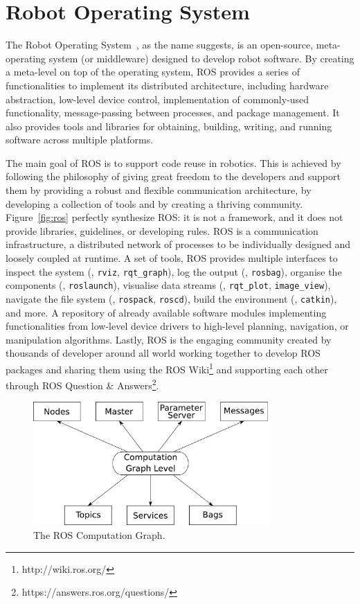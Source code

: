 \section{Robot Operating System}
\label{sec:ros}
The Robot Operating System~\cite{quigley2009ros}, as the name suggests, is an open-source, meta-operating system (or middleware) designed to develop robot software. By creating a meta-level on top of the operating system, ROS provides a series of functionalities to implement its distributed architecture, including hardware abstraction, low-level device control, implementation of commonly-used functionality, message-passing between processes, and package management. It also provides tools and libraries for obtaining, building, writing, and running software across multiple platforms.

The main goal of ROS is to support code reuse in robotics. This is achieved by following the philosophy of giving great freedom to the developers and support them by providing a robust and flexible communication architecture, by developing a collection of tools and by creating a thriving community. Figure~\ref{fig:ros} perfectly synthesize ROS: it is not a framework, and it does not provide libraries, guidelines, or developing rules. ROS is a communication infrastructure, a distributed network of processes to be individually designed and loosely coupled at runtime. A set of tools, ROS provides multiple interfaces to inspect the system (\eg, \texttt{rviz}, \texttt{rqt\_graph}), log the output (\eg, \texttt{rosbag}), organise the components (\eg, \texttt{roslaunch}), visualise data streams (\eg, \texttt{rqt\_plot}, \texttt{image\_view}), navigate the file system (\eg, \texttt{rospack}, \texttt{roscd}), build the environment (\eg, \texttt{catkin}), and more. A repository of already available software modules implementing functionalities from low-level device drivers to high-level planning, navigation, or manipulation algorithms. Lastly, ROS is the engaging community created by thousands of developer around all world working together to develop ROS packages and sharing them using the ROS Wiki\footnote{http://wiki.ros.org/} and supporting each other through ROS Question \& Answers\footnote{https://answers.ros.org/questions/}.

\begin{figure}[t]
    \centering
    \includegraphics[width=0.8\textwidth]{gfx/ros/graph}
    \caption{The ROS Computation Graph.}\label{fig:ros-graph}
\end{figure}

